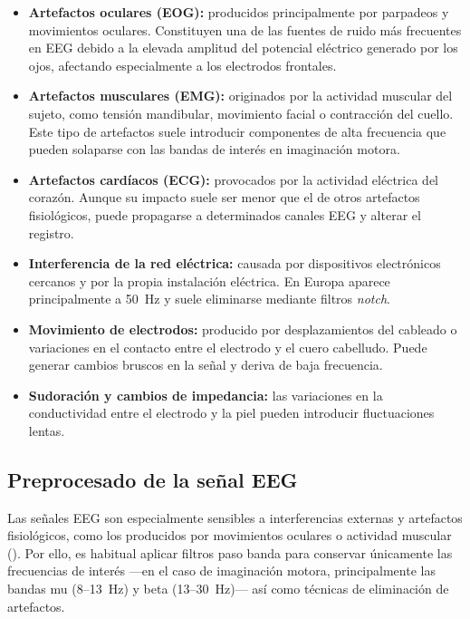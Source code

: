\begin{itemize}

\item \textbf{Artefactos oculares (EOG):} producidos principalmente por parpadeos y movimientos oculares. Constituyen una de las fuentes de ruido más frecuentes en EEG debido a la elevada amplitud del potencial eléctrico generado por los ojos, afectando especialmente a los electrodos frontales.

\item \textbf{Artefactos musculares (EMG):} originados por la actividad muscular del sujeto, como tensión mandibular, movimiento facial o contracción del cuello. Este tipo de artefactos suele introducir componentes de alta frecuencia que pueden solaparse con las bandas de interés en imaginación motora.

\item \textbf{Artefactos cardíacos (ECG):} provocados por la actividad eléctrica del corazón. Aunque su impacto suele ser menor que el de otros artefactos fisiológicos, puede propagarse a determinados canales EEG y alterar el registro.

\item \textbf{Interferencia de la red eléctrica:} causada por dispositivos electrónicos cercanos y por la propia instalación eléctrica. En Europa aparece principalmente a 50~Hz y suele eliminarse mediante filtros \textit{notch}.

\item \textbf{Movimiento de electrodos:} producido por desplazamientos del cableado o variaciones en el contacto entre el electrodo y el cuero cabelludo. Puede generar cambios bruscos en la señal y deriva de baja frecuencia.

\item \textbf{Sudoración y cambios de impedancia:} las variaciones en la conductividad entre el electrodo y la piel pueden introducir fluctuaciones lentas.

\end{itemize}

\subsection{Preprocesado de la señal EEG}
\label{subsec:preprocesadoEEG}

Las señales EEG son especialmente sensibles a interferencias externas y artefactos fisiológicos, como los producidos por movimientos oculares o actividad muscular (\cite{jung2000removing}). Por ello, es habitual aplicar filtros paso banda para conservar únicamente las frecuencias de interés —en el caso de imaginación motora, principalmente las bandas mu (8–13~Hz) y beta (13–30~Hz)— así como técnicas de eliminación de artefactos.

